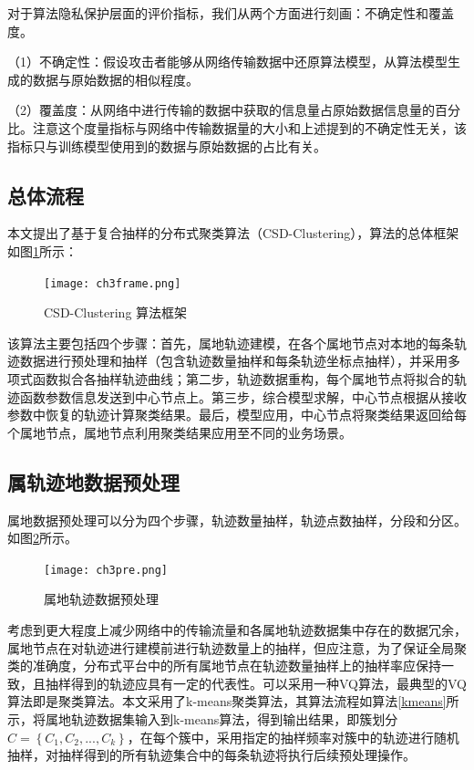 对于算法隐私保护层面的评价指标，我们从两个方面进行刻画：不确定性和覆盖度。

（1）不确定性：假设攻击者能够从网络传输数据中还原算法模型，从算法模型生成的数据与原始数据的相似程度。

（2）覆盖度：从网络中进行传输的数据中获取的信息量占原始数据信息量的百分比。注意这个度量指标与网络中传输数据量的大小和上述提到的不确定性无关，该指标只与训练模型使用到的数据与原始数据的占比有关。

\subsection{总体流程}

本文提出了基于复合抽样的分布式聚类算法（CSD-Clustering），算法的总体框架如图\ref{ch3frame}所示：
\begin{figure}[h]
	\texttt{[image: ch3frame.png]}
	\caption{CSD-Clustering 算法框架}
	\label{ch3frame}
\end{figure}

该算法主要包括四个步骤：首先，属地轨迹建模，在各个属地节点对本地的每条轨迹数据进行预处理和抽样（包含轨迹数量抽样和每条轨迹坐标点抽样），并采用多项式函数拟合各抽样轨迹曲线；第二步，轨迹数据重构，每个属地节点将拟合的轨迹函数参数信息发送到中心节点上。第三步，综合模型求解，中心节点根据从接收参数中恢复的轨迹计算聚类结果。最后，模型应用，中心节点将聚类结果返回给每个属地节点，属地节点利用聚类结果应用至不同的业务场景。 

\subsection{属轨迹地数据预处理}

属地数据预处理可以分为四个步骤，轨迹数量抽样，轨迹点数抽样，分段和分区。如图\ref{ch3pre}所示。
\begin{figure}[H]
	\texttt{[image: ch3pre.png]}
	\caption{属地轨迹数据预处理}
	\label{ch3pre}
\end{figure}

考虑到更大程度上减少网络中的传输流量和各属地轨迹数据集中存在的数据冗余，属地节点在对轨迹进行建模前进行轨迹数量上的抽样，但应注意，为了保证全局聚类的准确度，分布式平台中的所有属地节点在轨迹数量抽样上的抽样率应保持一致，且抽样得到的轨迹应具有一定的代表性。可以采用一种VQ算法，最典型的VQ算法即是聚类算法。本文采用了k-means聚类算法，其算法流程如算法\ref{kmeans}所示，将属地轨迹数据集输入到k-means算法，得到输出结果，即簇划分$C=\left\{C_1,C_2,...,C_k\right\}$，在每个簇中，采用指定的抽样频率对簇中的轨迹进行随机抽样，对抽样得到的所有轨迹集合中的每条轨迹将执行后续预处理操作。


